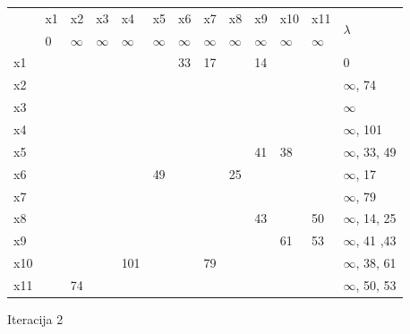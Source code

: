 \documentclass[12pt]{article}
\begin{document}
\begin{table}[hp]
\centering
\begin{tabular}{|l|l|l|l|l|l|l|l|l|l|l|l|l|}
\hline
\multirow{2}{*}{} & x1 & x2 & x3 & x4 & x5 & x6 & x7 & x8 & x9 & x10 & x11 & \multirow{2}{*}{$\lambda$} \\ \cline{2-12}
 & 0 & $\infty$ & $\infty$ & $\infty$ & $\infty$ & $\infty$ & $\infty$ & $\infty$ & $\infty$ & $\infty$ & $\infty$ &  \\ \hline
x1 &  &  &  &  &  & 33 & 17 &  & 14 &  &  & 0 \\ \hline
x2 &  &  &  &  &  &  &  &  &  &  &  & $\infty$, 74 \\ \hline
x3 &  &  &  &  &  &  &  &  &  &  &  & $\infty$ \\ \hline
x4 &  &  &  &  &  &  &  &  &  &  &  & $\infty$, 101 \\ \hline
x5 &  &  &  &  &  &  &  &  & 41 & 38 &  & $\infty$, 33, 49 \\ \hline
x6 &  &  &  &  & 49 &  &  & 25 &  &  &  & $\infty$, 17 \\ \hline
x7 &  &  &  &  &  &  &  &  &  &  &  & $\infty$, 79 \\ \hline
x8 &  &  &  &  &  &  &  &  & 43 &  & 50 & $\infty$, 14, 25 \\ \hline
x9 &  &  &  &  &  &  &  &  &  & 61 & 53 & $\infty$, 41 ,43 \\ \hline
x10 &  &  &  & 101 &  &  & 79 &  &  &  &  & $\infty$, 38, 61 \\ \hline
x11 &  & 74 &  &  &  &  &  &  &  &  &  & $\infty$, 50, 53 \\ \hline
\end{tabular}
\end{table}

Iteracija 2
\end{document}
